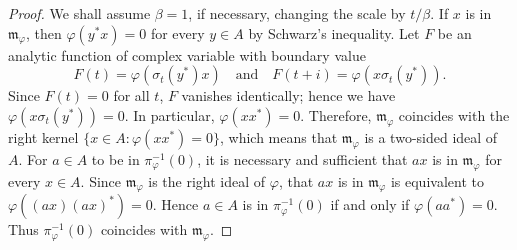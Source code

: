 \documentclass[12pt,b5paper,twoside]{article}
\theoremstyle{takesaki}
\numberwithin{equation}{section}
\begin{document}
\begin{proof}
We shall assume $\beta=1$, if necessary, changing the scale by
$t/\beta$.  If $x$ is in $\mathfrak m_\varphi$, then
$\varphi(y^*x)=0$ for every $y\in A$ by Schwarz's inequality.  Let
$F$ be an analytic function of complex variable with boundary value
\[
 F(t)=\varphi(\sigma_t(y^*)x)
 \quad\text{and}\quad
 F(t+i)=\varphi(x\sigma_t(y^*)).
\]
Since $F(t)=0$ for all $t$, $F$ vanishes identically; hence we have
$\varphi(x\sigma_t(y^*))=0$.  In particular,
$\varphi(xx^*)=0$.  Therefore, $\mathfrak m_\varphi$ coincides with
the right kernel $\{x\in A:\varphi(xx^*)=0\}$, which means that
$\mathfrak m_\varphi$ is a two-sided ideal of $A$.  For $a\in A$ to
be in $\pi_\varphi^{-1}(0)$, it is necessary and sufficient that
$ax$ is in $\mathfrak m_\varphi$ for every $x\in A$.  Since
$\mathfrak m_\varphi$ is the right ideal of $\varphi$, that $ax$ is
in $\mathfrak m_\varphi$ is equivalent to
$\varphi((ax)(ax)^*)=0$.  Hence $a\in A$ is in
$\pi_\varphi^{-1}(0)$ if and only if $\varphi(aa^*)=0$.  Thus
$\pi_\varphi^{-1}(0)$ coincides with $\mathfrak m_\varphi$.


\end{proof}
\end{document}

